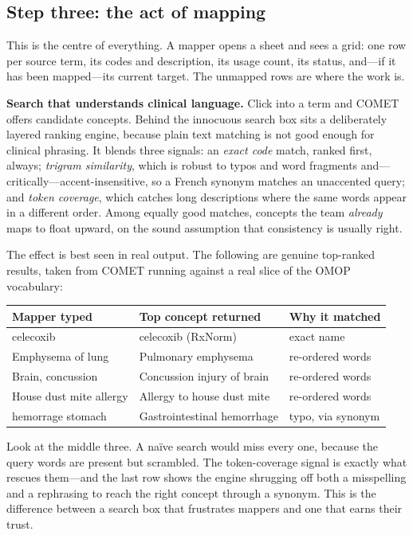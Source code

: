 \documentclass[12pt,openany]{book}
\begin{document}
\subsection{Step three: the act of mapping}

This is the centre of everything. A mapper opens a sheet and sees a grid: one row per source term, its
codes and description, its usage count, its status, and---if it has been mapped---its current target.
The unmapped rows are where the work is.

\textbf{Search that understands clinical language.} Click into a term and COMET offers candidate
concepts. Behind the innocuous search box sits a deliberately layered ranking engine, because plain
text matching is not good enough for clinical phrasing. It blends three signals: an \emph{exact code}
match, ranked first, always; \emph{trigram similarity}, which is robust to typos and word fragments
and---critically---accent-insensitive, so a French synonym matches an unaccented query; and
\emph{token coverage}, which catches long descriptions where the same words appear in a different
order. Among equally good matches, concepts the team \emph{already} maps to float upward, on the sound
assumption that consistency is usually right.

The effect is best seen in real output. The following are genuine top-ranked results, taken from
COMET running against a real slice of the OMOP vocabulary:

\begin{center}
\small\sffamily
\begin{tabular}{@{}lll@{}}
\toprule
\textbf{Mapper typed} & \textbf{Top concept returned} & \textbf{Why it matched} \\
\midrule
celecoxib & celecoxib (RxNorm) & exact name \\
Emphysema of lung & Pulmonary emphysema & re-ordered words \\
Brain, concussion & Concussion injury of brain & re-ordered words \\
House dust mite allergy & Allergy to house dust mite & re-ordered words \\
hemorrage stomach & Gastrointestinal hemorrhage & typo, via synonym \\
\bottomrule
\end{tabular}
\end{center}

Look at the middle three. A na\"ive search would miss every one, because the query words are present
but scrambled. The token-coverage signal is exactly what rescues them---and the last row shows the
engine shrugging off both a misspelling and a rephrasing to reach the right concept through a synonym.
This is the difference between a search box that frustrates mappers and one that earns their trust.
\end{document}

